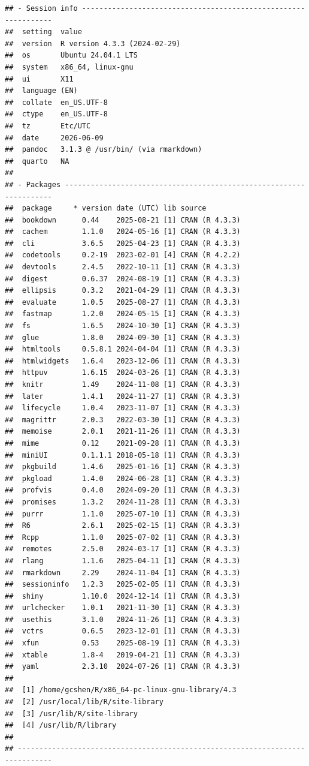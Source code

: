 \documentclass[
  twoside,12pt,fontset=none]{ctexbook}
\begin{document}
\begin{verbatim}
## - Session info ---------------------------------------------------------------
##  setting  value
##  version  R version 4.3.3 (2024-02-29)
##  os       Ubuntu 24.04.1 LTS
##  system   x86_64, linux-gnu
##  ui       X11
##  language (EN)
##  collate  en_US.UTF-8
##  ctype    en_US.UTF-8
##  tz       Etc/UTC
##  date     2026-06-09
##  pandoc   3.1.3 @ /usr/bin/ (via rmarkdown)
##  quarto   NA
## 
## - Packages -------------------------------------------------------------------
##  package     * version date (UTC) lib source
##  bookdown      0.44    2025-08-21 [1] CRAN (R 4.3.3)
##  cachem        1.1.0   2024-05-16 [1] CRAN (R 4.3.3)
##  cli           3.6.5   2025-04-23 [1] CRAN (R 4.3.3)
##  codetools     0.2-19  2023-02-01 [4] CRAN (R 4.2.2)
##  devtools      2.4.5   2022-10-11 [1] CRAN (R 4.3.3)
##  digest        0.6.37  2024-08-19 [1] CRAN (R 4.3.3)
##  ellipsis      0.3.2   2021-04-29 [1] CRAN (R 4.3.3)
##  evaluate      1.0.5   2025-08-27 [1] CRAN (R 4.3.3)
##  fastmap       1.2.0   2024-05-15 [1] CRAN (R 4.3.3)
##  fs            1.6.5   2024-10-30 [1] CRAN (R 4.3.3)
##  glue          1.8.0   2024-09-30 [1] CRAN (R 4.3.3)
##  htmltools     0.5.8.1 2024-04-04 [1] CRAN (R 4.3.3)
##  htmlwidgets   1.6.4   2023-12-06 [1] CRAN (R 4.3.3)
##  httpuv        1.6.15  2024-03-26 [1] CRAN (R 4.3.3)
##  knitr         1.49    2024-11-08 [1] CRAN (R 4.3.3)
##  later         1.4.1   2024-11-27 [1] CRAN (R 4.3.3)
##  lifecycle     1.0.4   2023-11-07 [1] CRAN (R 4.3.3)
##  magrittr      2.0.3   2022-03-30 [1] CRAN (R 4.3.3)
##  memoise       2.0.1   2021-11-26 [1] CRAN (R 4.3.3)
##  mime          0.12    2021-09-28 [1] CRAN (R 4.3.3)
##  miniUI        0.1.1.1 2018-05-18 [1] CRAN (R 4.3.3)
##  pkgbuild      1.4.6   2025-01-16 [1] CRAN (R 4.3.3)
##  pkgload       1.4.0   2024-06-28 [1] CRAN (R 4.3.3)
##  profvis       0.4.0   2024-09-20 [1] CRAN (R 4.3.3)
##  promises      1.3.2   2024-11-28 [1] CRAN (R 4.3.3)
##  purrr         1.1.0   2025-07-10 [1] CRAN (R 4.3.3)
##  R6            2.6.1   2025-02-15 [1] CRAN (R 4.3.3)
##  Rcpp          1.1.0   2025-07-02 [1] CRAN (R 4.3.3)
##  remotes       2.5.0   2024-03-17 [1] CRAN (R 4.3.3)
##  rlang         1.1.6   2025-04-11 [1] CRAN (R 4.3.3)
##  rmarkdown     2.29    2024-11-04 [1] CRAN (R 4.3.3)
##  sessioninfo   1.2.3   2025-02-05 [1] CRAN (R 4.3.3)
##  shiny         1.10.0  2024-12-14 [1] CRAN (R 4.3.3)
##  urlchecker    1.0.1   2021-11-30 [1] CRAN (R 4.3.3)
##  usethis       3.1.0   2024-11-26 [1] CRAN (R 4.3.3)
##  vctrs         0.6.5   2023-12-01 [1] CRAN (R 4.3.3)
##  xfun          0.53    2025-08-19 [1] CRAN (R 4.3.3)
##  xtable        1.8-4   2019-04-21 [1] CRAN (R 4.3.3)
##  yaml          2.3.10  2024-07-26 [1] CRAN (R 4.3.3)
## 
##  [1] /home/gcshen/R/x86_64-pc-linux-gnu-library/4.3
##  [2] /usr/local/lib/R/site-library
##  [3] /usr/lib/R/site-library
##  [4] /usr/lib/R/library
## 
## ------------------------------------------------------------------------------
\end{verbatim}
\end{document}
